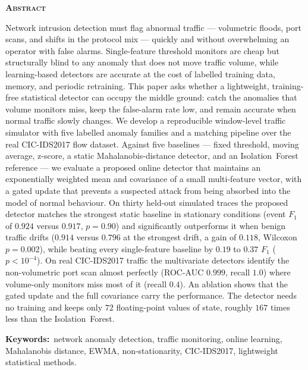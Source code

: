\documentclass[11pt,a4paper]{article}
\begin{document}
\begin{center}{\large\bfseries\scshape Abstract}\end{center}
\vspace{-2pt}
{\small
Network intrusion detection must flag abnormal traffic --- volumetric floods,
port scans, and shifts in the protocol mix --- quickly and without overwhelming
an operator with false alarms. Single-feature threshold monitors are cheap but
structurally blind to any anomaly that does not move traffic volume, while
learning-based detectors are accurate at the cost of labelled training data,
memory, and periodic retraining. This paper asks whether a lightweight,
training-free statistical detector can occupy the middle ground: catch the
anomalies that volume monitors miss, keep the false-alarm rate low, and remain
accurate when normal traffic slowly changes. We develop a reproducible
window-level traffic simulator with five labelled anomaly families and a matching
pipeline over the real CIC-IDS2017 flow dataset. Against five baselines --- fixed
threshold, moving average, z-score, a static Mahalanobis-distance detector, and an
Isolation~Forest reference --- we evaluate a proposed online detector that
maintains an exponentially weighted mean and covariance of a small multi-feature
vector, with a gated update that prevents a suspected attack from being absorbed
into the model of normal behaviour. On thirty held-out simulated traces the
proposed detector matches the strongest static baseline in stationary conditions
(event $F_1$ of $0.924$ versus $0.917$, $p = 0.90$) and significantly outperforms
it when benign traffic drifts ($0.914$ versus $0.796$ at the strongest drift, a
gain of $0.118$, Wilcoxon $p = 0.002$), while beating every single-feature
baseline by $0.19$ to $0.37$ $F_1$ ($p < 10^{-4}$). On real CIC-IDS2017 traffic
the multivariate detectors identify the non-volumetric port scan almost perfectly
(ROC-AUC $0.999$, recall $1.0$) where volume-only monitors miss most of it
(recall $0.4$). An ablation shows that the gated update and the full covariance
carry the performance. The detector needs no training and keeps only $72$
floating-point values of state, roughly $167$ times less than the
Isolation~Forest.

\vspace{6pt}
\noindent\textbf{Keywords:}~network anomaly detection, traffic monitoring, online
learning, Mahalanobis distance, EWMA, non-stationarity, CIC-IDS2017, lightweight
statistical methods.
}
\vspace{6pt}
\end{document}

